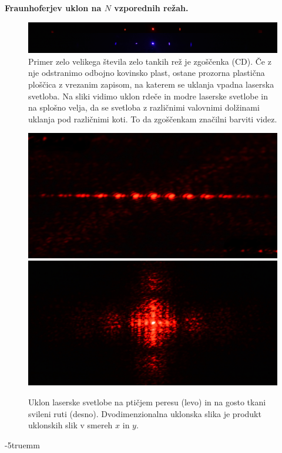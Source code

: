 \begin{example}{\bf Fraunhoferjev uklon na $N$ vzporednih režah.}
\begin{figure}[ht]
\centering
\includegraphics[width=145truemm]{slike/05_photos_CD.JPG}
\caption{Primer zelo velikega števila zelo tankih rež je zgoščenka (CD). Če z nje odstranimo
odbojno kovinsko plast, ostane prozorna plastična ploščica z vrezanim zapisom, na katerem se uklanja 
vpadna laserska svetloba. Na sliki vidimo uklon rdeče in modre laserske svetlobe in na splošno velja, da se svetloba z različnimi valovnimi dolžinami uklanja pod različnimi koti. To da zgoščenkam značilni barviti videz.}
\label{fig:05_uklon_cd}
\end{figure}
\begin{figure}[ht]
\centering
\includegraphics[width=70truemm]{slike/05_photos_perje.jpg}\hfill
\includegraphics[width=70truemm]{slike/05_photos_ruta.jpg}
\caption{Uklon laserske svetlobe na ptičjem peresu (levo) in na gosto tkani svileni ruti (desno).
Dvodimenzionalna uklonska slika je produkt uklonskih slik v smereh $x$ in $y$.}
\label{fig:05_uklon_ruta}
\end{figure}
\vglue-5truemm
\end{example}

